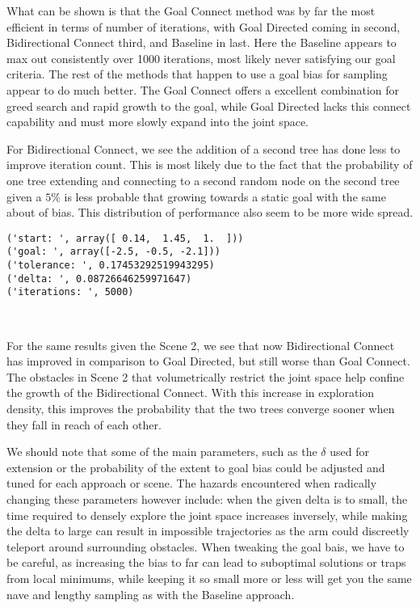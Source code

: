 \documentclass{article}
\begin{document}
What can be shown is that the Goal Connect method was by far the most
efficient in terms of number of iterations, with Goal Directed coming in
second, Bidirectional Connect third, and Baseline in last. Here the
Baseline appears to max out consistently over 1000 iterations, most
likely never satisfying our goal criteria. The rest of the methods that
happen to use a goal bias for sampling appear to do much better. The
Goal Connect offers a excellent combination for greed search and rapid
growth to the goal, while Goal Directed lacks this connect capability
and must more slowly expand into the joint space.

For Bidirectional Connect, we see the addition of a second tree has done
less to improve iteration count. This is most likely due to the fact
that the probability of one tree extending and connecting to a second
random node on the second tree given a $5\%$ is less probable that
growing towards a static goal with the same about of bias. This
distribution of performance also seem to be more wide spread.


    \begin{Verbatim}[commandchars=\\\{\}]
('start: ', array([ 0.14,  1.45,  1.  ]))
('goal: ', array([-2.5, -0.5, -2.1]))
('tolerance: ', 0.17453292519943295)
('delta: ', 0.08726646259971647)
('iterations: ', 5000)
    \end{Verbatim}



    \begin{center}
    \end{center}
    { \hspace*{\fill} \\}
    
    For the same results given the Scene 2, we see that now Bidirectional
Connect has improved in comparison to Goal Directed, but still worse
than Goal Connect. The obstacles in Scene 2 that volumetrically restrict
the joint space help confine the growth of the Bidirectional Connect.
With this increase in exploration density, this improves the probability
that the two trees converge sooner when they fall in reach of each
other.

We should note that some of the main parameters, such as the $\delta$
used for extension or the probability of the extent to goal bias could
be adjusted and tuned for each approach or scene. The hazards
encountered when radically changing these parameters however include:
when the given delta is to small, the time required to densely explore
the joint space increases inversely, while making the delta to large can
result in impossible trajectories as the arm could discreetly teleport
around surrounding obstacles. When tweaking the goal bais, we have to be
careful, as increasing the bias to far can lead to suboptimal solutions
or traps from local minimums, while keeping it so small more or less
will get you the same nave and lengthy sampling as with the Baseline
approach.
\end{document}
